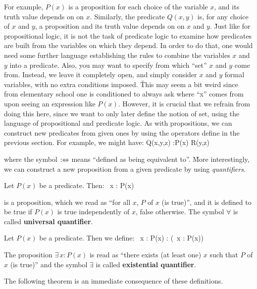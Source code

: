 For example, $P(x)$ is a proposition for each choice of the variable $x$, and its truth value depends on on $x$.
Similarly, the predicate $Q(x,y)$ is, for any choice of $x$ and $y$, a proposition and its truth value depends on on
$x$ and $y$. \v

Just like for propositional logic, it is not the task of predicate logic to examine how predicates are built from the
variables on which they depend. In order to do that, one would need some further language establishing the rules to
combine the variables $x$ and $y$ into a predicate. Also, you may want to specify from which ``set'' $x$ and $y$ come
from. Instead, we leave it completely open, and simply consider $x$ and $y$ formal variables, with no extra
conditions imposed. \v

This may seem a bit weird since from elementary school one is conditioned to always ask where ``x'' comes from upon
seeing an expression like $P(x)$. However, it is crucial that we refrain from doing this here, since we want to only
later define the notion of set, using the language of propositional and predicate logic. As with propositions, we can
construct new predicates from given ones by using the operators define in the previous section. For example, we might
have:
\bse
Q(x,y,z) :\eqv P(x) \land R(y,z)
\ese

where the symbol $:\Leftrightarrow$ means ``defined as being equivalent to''. \v

More interestingly, we can construct a new proposition from a given predicate by using \emph{quantifiers}.

Let $P(x)$ be a predicate. Then:
\bse
\forall \, x : P(x)
\ese

is a proposition, which we read as ``for all $x$, $P$ of $x$ (is true)'', and it is defined to be true if $P(x)$ is
true independently of $x$, false otherwise. The symbol $\forall$\index{$\forall$} is called \textbf{universal
quantifier}.
\ed

Let $P(x)$ be a predicate. Then we define:
\bse
\exists \, x : P(x) : \eqv \neg (\forall \, x : \neg P(x))
\ese

The proposition $\exists \, x : P(x)$ is read as ``there exists (at least one) $x$ such that $P$ of $x$ (is true)''
and the symbol $\exists$\index{$\exists$} is called \textbf{existential quantifier}.
\ed

The following theorem is an immediate consequence of these definitions.

